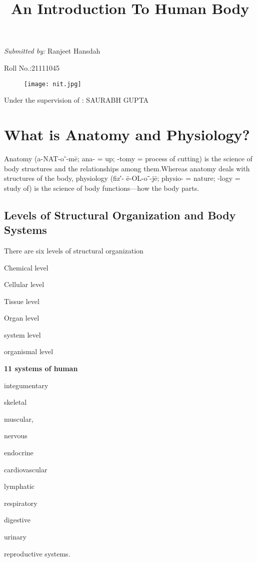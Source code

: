 \documentclass[11pt]{article}
\title{\textbf{An Introduction To Human Body}}
\begin{document}
\maketitle
\centering
\emph{\large Submitted by:}
\large Ranjeet Hansdah

\large Roll No.:21111045
\begin{figure}[h]
\begin{center}
\texttt{[image: nit.jpg]}
\end{center}
\end{figure}

\large Under the supervision of : SAURABH GUPTA 
\clearpage 
\tableofcontents
\clearpage
\section{What is Anatomy and Physiology?}

\raggedright Anatomy (a-NAT-oˉ-mē; ana- = up; -tomy = process of cutting) is the
science of body structures and the relationships among them.Whereas anatomy deals with structures of the body, physiology (fiz′-
ē-OL-oˉ-jē; physio- = nature; -logy = study of) is the science of body
functions—how the body parts. 
\subsection{Levels of Structural
Organization and
Body Systems}

There are six levels of structural organization
\item Chemical level
\item Cellular level
\item Tissue level
\item Organ level
\item system level
\item organismal level
\item \textbf{11 systems of human} 
 \item integumentary
 \item skeletal
\item muscular,
\item nervous \item endocrine \item cardiovascular \item lymphatic \item respiratory \item digestive \item urinary \item reproductive systems.
\end{document}
